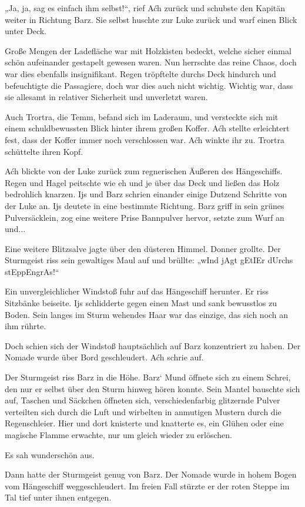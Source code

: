 „Ja, ja, sag es einfach ihm selbst!“, rief Aćh zurück und schubste den Kapitän weiter in Richtung Barz. Sie selbst huschte zur Luke zurück und warf einen Blick unter Deck.

Große Mengen der Ladefläche war mit Holzkisten bedeckt, welche sicher einmal schön aufeinander gestapelt gewesen waren. Nun herrschte das reine Chaos, doch war dies ebenfalls insignifikant. Regen tröpftelte durchs Deck hindurch und befeuchtigte die Passagiere, doch war dies auch nicht wichtig. Wichtig war, dass sie allesamt in relativer Sicherheit und unverletzt waren.

Auch Trortra, die Temm, befand sich im Laderaum, und versteckte sich mit einem schuldbewussten Blick hinter ihrem großen Koffer. Aćh stellte erleichtert fest, dass der Koffer immer noch verschlossen war. Aćh winkte ihr zu. Trortra schüttelte ihren Kopf.

Aćh blickte von der Luke zurück zum regnerischen Äußeren des Hängeschiffs. Regen und Hagel peitschte wie eh und je über das Deck und ließen das Holz bedrohlich knarzen. Ijs und Barz schrien einander einige Dutzend Schritte von der Luke an. Ijs deutete in eine bestimmte Richtung. Barz griff in sein grünes Pulversäcklein, zog eine weitere Prise Bannpulver hervor, setzte zum Wurf an und...

Eine weitere Blitzsalve jagte über den düsteren Himmel. Donner grollte. Der Sturmgeist riss sein gewaltiges Maul auf und brüllte: „wInd jAgt gEtIEr dUrchs stEppEngrAs!“

Ein unvergleichlicher Windstoß fuhr auf das Hängeschiff herunter. Er riss Sitzbänke beiseite. Ijs schlidderte gegen einen Mast und sank bewusstlos zu Boden. Sein langes im Sturm wehendes Haar war das einzige, das sich noch an ihm rührte.

Doch schien sich der Windstoß hauptsächlich auf Barz konzentriert zu haben. Der Nomade wurde über Bord geschleudert. Aćh schrie auf.

Der Sturmgeist riss Barz in die Höhe. Barz‘ Mund öffnete sich zu einem Schrei, den nur er selbst über den Sturm hinweg hören konnte. Sein Mantel bauschte sich auf, Taschen und Säckchen öffneten sich, verschiedenfarbig glitzernde Pulver verteilten sich durch die Luft und wirbelten in anmutigen Mustern durch die Regenschleier. Hier und dort knisterte und knatterte es, ein Glühen oder eine magische Flamme erwachte, nur um gleich wieder zu erlöschen.

Es sah wunderschön aus.

Dann hatte der Sturmgeist genug von Barz. Der Nomade wurde in hohem Bogen vom Hängeschiff weggeschleudert. Im freien Fall stürzte er der roten Steppe im Tal tief unter ihnen entgegen.

